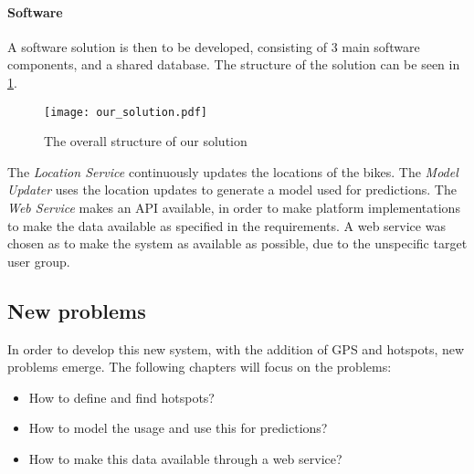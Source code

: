 \paragraph{Software}
A software solution is then to be developed, consisting of 3 main software components, and a shared database.
The structure of the solution can be seen in \cref{fig:solution_structure}.

\begin{figure}[h]
\texttt{[image: our\_solution.pdf]}
\caption{The overall structure of our solution}
\label{fig:solution_structure}
\end{figure}

The \textit{Location Service} continuously updates the locations of the bikes.
The \textit{Model Updater} uses the location updates to generate a model used for predictions.
The \textit{Web Service} makes an API available, in order to make platform implementations to make the data available as specified in the requirements.
A web service was chosen as to make the system as available as possible, due to the unspecific target user group.

\subsection{New problems}
In order to develop this new system, with the addition of GPS and hotspots, new problems emerge.
The following chapters will focus on the problems:
\begin{itemize}
\item How to define and find hotspots?
\item How to model the usage and use this for predictions?
\item How to make this data available through a web service?
\end{itemize}